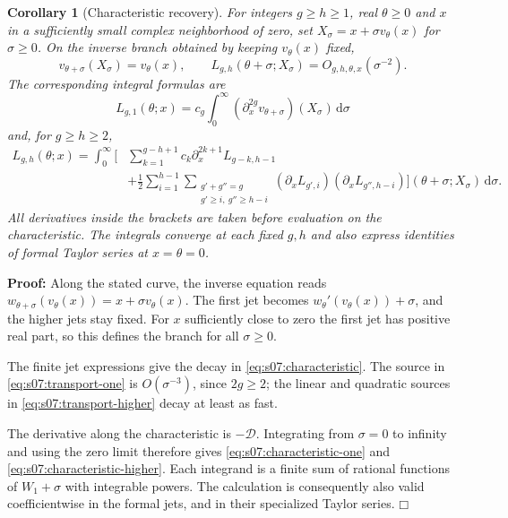 \documentclass[a4paper,10pt]{article}
\numberwithin{equation}{section}
\newcommand{\dd}{\mathrm{d}}
\theoremstyle{paperplain}
\newtheorem{crl}[thm]{Corollary}
\theoremstyle{paperremark}
\theoremstyle{paperplain}
\newenvironment{prf}{\noindent \textbf{Proof: }}{\hfill $\mdlgwhtsquare$\par\addvspace{0.5\baselineskip}}
\begin{document}
\begin{crl}[Characteristic recovery]\label{crl:s07:characteristic-recovery}
For integers $g\geq h\geq1$, real $\theta\geq0$ and $x$ in a sufficiently small complex
neighborhood of zero, set
$X_\sigma=x+\sigma v_\theta(x)$ for $\sigma\geq0$.
On the inverse branch obtained by keeping $v_\theta(x)$ fixed,
\begin{equation}\label{eq:s07:characteristic}
 v_{\theta+\sigma}(X_\sigma)=v_\theta(x),\qquad
 L_{g,h}(\theta+\sigma;X_\sigma)=O_{g,h,\theta,x}(\sigma^{-2}).
\end{equation}
The corresponding integral formulas are
\begin{equation}\label{eq:s07:characteristic-one}
 L_{g,1}(\theta;x)
 =c_g\int_0^\infty
       (\partial_x^{2g}v_{\theta+\sigma})(X_\sigma)\,\dd\sigma
\end{equation}
and, for $g\geq h\geq2$,
\begin{equation}\label{eq:s07:characteristic-higher}
 \begin{aligned}
 L_{g,h}(\theta;x)=\int_0^\infty
 \Biggl[&\sum_{k=1}^{g-h+1}c_k\partial_x^{2k+1}L_{g-k,h-1}\\
 &+\frac12\sum_{i=1}^{h-1}
   \sum_{\substack{g'+g''=g\\g'\geq i,\ g''\geq h-i}}
     (\partial_xL_{g',i})(\partial_xL_{g'',h-i})
 \Biggr](\theta+\sigma;X_\sigma)\,\dd\sigma.
 \end{aligned}
\end{equation}
All derivatives inside the brackets are taken before evaluation on
the characteristic. The integrals converge at each fixed $g,h$ and
also express identities of formal Taylor series at $x=\theta=0$.
\end{crl}
\begin{prf}
Along the stated curve, the inverse equation reads
$w_{\theta+\sigma}(v_\theta(x))=x+\sigma v_\theta(x)$.
The first jet becomes $w_\theta'(v_\theta(x))+\sigma$, and the
higher jets stay fixed. For $x$ sufficiently close to zero the
first jet has positive real part, so this defines the branch for
all $\sigma\geq0$.

The finite jet expressions give the decay in
\eqref{eq:s07:characteristic}. The source in
\eqref{eq:s07:transport-one} is $O(\sigma^{-3})$, since
$2g\geq2$; the linear and quadratic sources in
\eqref{eq:s07:transport-higher} decay at least as fast.

The derivative along the characteristic is $-\mathscr D$.
Integrating from $\sigma=0$ to infinity and using the zero limit
therefore gives \eqref{eq:s07:characteristic-one} and
\eqref{eq:s07:characteristic-higher}. Each integrand is a finite
sum of rational functions of $W_1+\sigma$ with integrable powers.
The calculation is consequently also valid coefficientwise in the
formal jets, and in their specialized Taylor series.
\end{prf}
\end{document}
